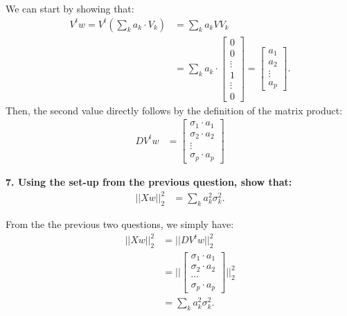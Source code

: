 \documentclass[12pt,hidelinks]{article}
\numberwithin{equation}{section}
\begin{document}
\vspace*{12pt}

We can start by showing that:
\begin{align}
V^t w = V^t (\sum_k a_k \cdot V_k) &= \sum_k a_k V V_k \\
&= \sum_k a_k \cdot \begin{bmatrix} 0 \\ 0 \\ \vdots \\ 1 \\ \vdots \\ 0 \end{bmatrix}
= \begin{bmatrix} a_1 \\ a_2 \\ \vdots \\ a_p \end{bmatrix}.
\end{align}
Then, the second value directly follows by the definition of the matrix product:
\begin{align}
D V^t w &= \begin{bmatrix} \sigma_1 \cdot a_1 \\ \sigma_2 \cdot a_2 \\ \vdots \\ \sigma_p \cdot a_p \end{bmatrix}
\end{align}

\textbf{7. Using the set-up from the previous question, show that:}
\begin{align}
|| X w ||_2^2 &= \sum_k a_k^2 \sigma_k^2.
\end{align}

\vspace*{12pt}

From the the previous two questions, we simply have:
\begin{align}
|| X w ||_2^2 &= || D V^t w ||_2^2 \\
&= || \begin{bmatrix} \sigma_1 \cdot a_1 \\ \sigma_2 \cdot a_2 \\ \cdots \\ \sigma_p \cdot a_p \end{bmatrix} ||_2^2 \\
&= \sum_k a_k^2 \sigma_k^2.
\end{align}

\vspace*{12pt}
\end{document}
